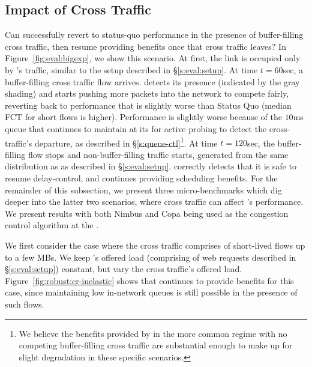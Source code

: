\subsection{Impact of Cross Traffic}\label{s:robust:cross}



Can \name successfully revert to status-quo performance in the presence of buffer-filling cross traffic, then resume providing benefits once that cross traffic leaves?
In Figure~\ref{fig:eval:bigexp}, we show this scenario.
At first, the link is occupied only by \name's traffic, similar to the setup described in \S\ref{s:eval:setup}.
At time $t=60$sec, a buffer-filling cross traffic flow arrives.
\name detects its presence (indicated by the gray shading) and starts pushing more packets into the network to compete fairly, reverting back to performance that is slightly worse than Status Quo (median FCT for short flows is \bigexpElasticSlowdownWorseness higher). 
Performance is slightly worse because of the $10$ms queue that \name continues to maintain at its \inbox for active probing to detect the cross-traffic's departure, as described in \S\ref{s:queue-ctl}\footnote{We believe the benefits provided by \name in the more common regime with no competing buffer-filling cross traffic are substantial enough to make up for slight degradation in these specific scenarios.}. 
At time $t=120$sec, the buffer-filling flow stops and non-buffer-filling traffic starts, generated from the same distribution as \name as described in \S\ref{s:eval:setup}.
\name correctly detects that it is safe to resume delay-control, and continues providing scheduling benefits.
For the remainder of this subsection, we present three micro-benchmarks which dig deeper into the latter two scenarios, where cross traffic can affect \name's performance. 
We present results with both Nimbus and Copa being used as the congestion control algorithm at the \inbox. 


 We first consider the case where the cross traffic comprises of short-lived flows up to a few MBs.
We keep \name's offered load (comprising of web requests described in \S\ref{s:eval:setup}) constant, but vary the cross traffic's offered load.
Figure~\ref{fig:robust:cr-inelastic} shows that \name continues to provide benefits for this case, since maintaining low in-network queues is still possible in the presence of such flows.

